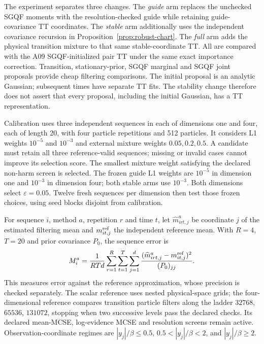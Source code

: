 \documentclass[11pt]{article}
\begin{document}
The experiment separates three changes. The \emph{guide} arm replaces the
unchecked SGQF moments with the resolution-checked guide while retaining
guide-covariance TT coordinates. The \emph{stable} arm additionally uses
the independent covariance recursion in Proposition~\ref{prop:robust-chart}.
The \emph{full} arm adds the physical transition mixture to that same
stable-coordinate TT. All are compared with the A09 SGQF-initialized pair
TT under the same exact importance correction. Transition, stationary-prior,
SGQF marginal and SGQF joint proposals provide cheap filtering comparisons.
The initial proposal is an analytic Gaussian; subsequent times have separate
TT fits. The stability change therefore does not assert that every proposal,
including the initial Gaussian, has a TT representation.

Calibration uses three independent sequences in each of dimensions one and
four, each of length 20, with four particle repetitions and 512 particles.
It considers L1 weights $10^{-5}$ and $10^{-3}$ and external mixture weights
$0.05,0.2,0.5$. A candidate must retain all three reference-valid sequences;
missing or invalid cases cannot improve its selection score. The smallest
mixture weight satisfying the declared non-harm screen is selected. The
frozen guide L1 weights are $10^{-5}$ in dimension one and $10^{-3}$ in
dimension four; both stable arms use $10^{-3}$. Both dimensions select
$\varepsilon=0.05$. Twelve fresh sequences per dimension then test those
frozen choices, using seed blocks disjoint from calibration.

For sequence $i$, method $a$, repetition $r$ and time $t$, let
$\widehat m^{a}_{irt,j}$ be coordinate $j$ of the estimated filtering mean
and $m^{\rm ref}_{it,j}$ the independent reference mean. With $R=4$, $T=20$
and prior covariance $P_0$, the sequence error is
\[
 M_i^a=\frac{1}{RTd}\sum_{r=1}^R\sum_{t=1}^T\sum_{j=1}^d
 \frac{(\widehat m^a_{irt,j}-m^{\rm ref}_{it,j})^2}{(P_0)_{jj}}.
\]
This measures error against the reference approximation, whose precision is
checked separately. The scalar reference uses nested physical-space grids;
the four-dimensional reference compares transition particle filters along
the ladder $32768$, $65536$, $131072$, stopping when two successive levels
pass the declared checks. Its declared mean-MCSE, log-evidence
MCSE and resolution screens remain active. Observation-coordinate regimes
are $|y_j|/\beta\le0.5$, $0.5<|y_j|/\beta<2$, and $|y_j|/\beta\ge2$.
\end{document}
